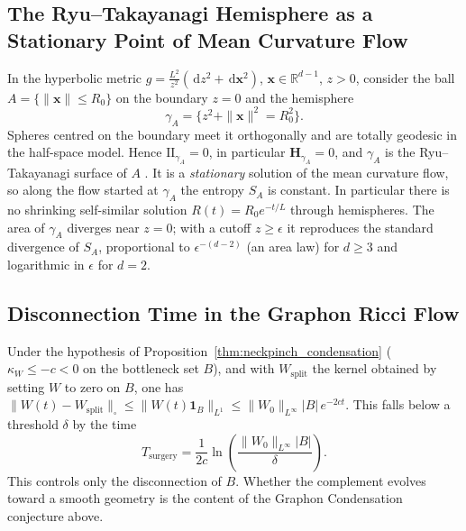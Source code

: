\documentclass[11pt,a4paper,reqno]{amsart}
\theoremstyle{definition}
\numberwithin{equation}{section}
\providecommand{\R}{\mathbb{R}}
\providecommand{\II}{\mathrm{I\!I}}
\providecommand{\cutnorm}[1]{\|#1\|_{\square}}
\newcommand{\dif}{\,\mathrm{d}}
\providecommand{\II}{\mathrm{II}}
\providecommand{\R}{\mathbb{R}}
\providecommand{\cutnorm}[1]{\|#1\|_{\square}}
\begin{document}
\subsection{The Ryu--Takayanagi Hemisphere as a Stationary Point of Mean Curvature Flow}
In the hyperbolic metric $g = \frac{L^2}{z^2}(\dif z^2 + \dif \mathbf{x}^2)$, $\mathbf{x} \in \R^{d-1}$, $z>0$, consider the ball $A = \{ \|\mathbf{x}\| \le R_0 \}$ on the boundary $z = 0$ and the hemisphere
\begin{equation}
    \gamma_A = \{ z^2 + \|\mathbf{x}\|^2 = R_0^2 \}.
\end{equation}
Spheres centred on the boundary meet it orthogonally and are totally geodesic in the half-space model. Hence $\II_{\gamma_A} = 0$, in particular $\mathbf{H}_{\gamma_A} = 0$, and $\gamma_A$ is the Ryu--Takayanagi surface of $A$ \cite{ryu2006holographic}. It is a \emph{stationary} solution of the mean curvature flow, so along the flow started at $\gamma_A$ the entropy $S_A$ is constant. In particular there is no shrinking self-similar solution $R(t) = R_0 e^{-t/L}$ through hemispheres. The area of $\gamma_A$ diverges near $z = 0$; with a cutoff $z \ge \epsilon$ it reproduces the standard divergence of $S_A$, proportional to $\epsilon^{-(d-2)}$ (an area law) for $d \ge 3$ and logarithmic in $\epsilon$ for $d = 2$.

\subsection{Disconnection Time in the Graphon Ricci Flow}
Under the hypothesis of Proposition~\ref{thm:neckpinch_condensation} ($\kappa_W \le -c < 0$ on the bottleneck set $B$), and with $W_{\mathrm{split}}$ the kernel obtained by setting $W$ to zero on $B$, one has $\cutnorm{W(t) - W_{\mathrm{split}}} \le \|W(t)\mathbf{1}_B\|_{L^1} \le \|W_0\|_{L^\infty} |B|\, e^{-2ct}$. This falls below a threshold $\delta$ by the time
\begin{equation}
    \label{eq:exact_surgery_time}
    T_{\mathrm{surgery}} = \frac{1}{2 c} \ln\left( \frac{\|W_0\|_{L^\infty}|B|}{\delta} \right).
\end{equation}
This controls only the disconnection of $B$. Whether the complement evolves toward a smooth geometry is the content of the Graphon Condensation conjecture above.
\end{document}
